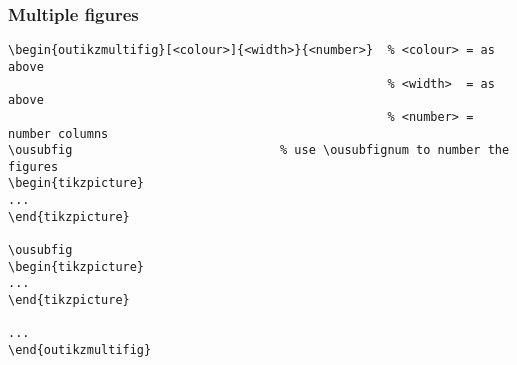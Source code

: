 \documentclass[11pt,a4paper]{article}
\begin{document}
\subsubsection*{Multiple figures}
\vspace*{-\baselineskip}
\begin{verbatim}
\begin{outikzmultifig}[<colour>]{<width>}{<number>}  % <colour> = as above
                                                     % <width>  = as above
                                                     % <number> = number columns
\ousubfig                             % use \ousubfignum to number the figures
\begin{tikzpicture}                      
...
\end{tikzpicture}

\ousubfig
\begin{tikzpicture}                      
...
\end{tikzpicture}

...
\end{outikzmultifig}
\end{verbatim}
\end{document}
